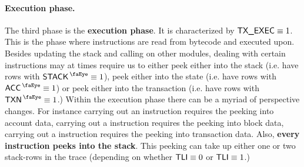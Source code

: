 \paragraph*{Execution phase.}
The third phase is the \textbf{execution phase}.
It is characterized by $\textsf{TX}\textsf{\_EXEC} \equiv 1$. This is the phase where instructions are read from bytecode and executed upon. Besides updating the stack and calling on other modules, dealing with certain instructions may at times require us to either
peek either into the stack       (i.e. have rows with $\peekStack \equiv 1$),
peek either into the state       (i.e. have rows with $\peekAccount \equiv 1$) or
peek either into the transaction (i.e. have rows with $\peekTransaction \equiv 1$.)
Within the execution phase there can be a myriad of perspective changes.
For instance
carrying out an  instruction requires the \zkEvm{} peeking into account data,
carrying out a        instruction requires the \zkEvm{} peeking into block data,
carrying out a        instruction requires the \zkEvm{} peeking into transaction data.
Also, \textbf{every instruction peeks into the stack}.
This peeking can take up either one or two stack-rows in the trace (depending on whether $\textsf{TLI} \equiv 0$ or $\textsf{TLI} \equiv 1$.)

